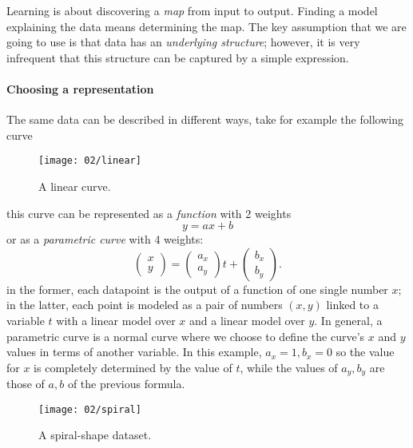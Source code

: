 
Learning is about discovering a \emph{map} from input to output. Finding a model explaining the data means determining the map.
The key assumption that we are going to use is that data has an \emph{underlying structure}; however, it is very infrequent that this structure can be captured by a simple expression.

\paragraph{Choosing a representation}
The same data can be described in different ways, take for example the following curve
\begin{figure}[H]
	\centering
	\texttt{[image: 02/linear]}
	\caption{A linear curve.}\label{fig:linear}	
\end{figure}
this curve can be represented as a \emph{function} with 2 weights
\begin{equation}
	y = ax + b
\end{equation}
or as a \emph{parametric curve} with 4 weights:
\begin{equation}
	\begin{pmatrix}x\\y\end{pmatrix} = \begin{pmatrix}a_x\\a_y\end{pmatrix}t+\begin{pmatrix}b_x\\b_y\end{pmatrix}.
\end{equation}
in the former, each datapoint is the output of a function of one single number $x$; in the latter, each point is modeled as a pair of numbers $(x,y)$ linked to a variable $t$ with a linear model over $x$ and a linear model over $y$. In general, a parametric curve is a normal curve where we choose to define the curve's $x$ and $y$ values in terms of another variable.
In this example, $a_x = 1, b_x = 0$ so the value for $x$ is completely determined by the value of $t$, while the values of $a_y, b_y$ are those of $a,b$ of the previous formula.

\begin{figure}[H]
	\centering
	\texttt{[image: 02/spiral]}
	\caption{A spiral-shape dataset.}\label{fig:spiral}
\end{figure}

